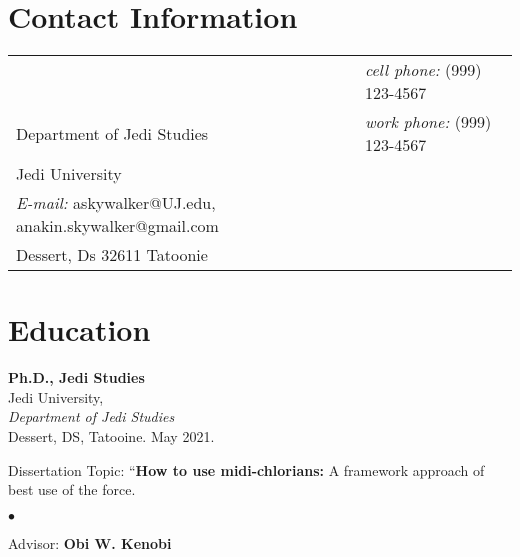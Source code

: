 \documentclass[margin,line]{res}
\newenvironment{list1}{
  \begin{list}{\ding{113}}{%
      \setlength{\itemsep}{0in}
      \setlength{\parsep}{0in} \setlength{\parskip}{0in}
      \setlength{\topsep}{0in} \setlength{\partopsep}{0in} 
      \setlength{\leftmargin}{0.17in}}}{\end{list}}
\newenvironment{list2}{
  \begin{list}{$\bullet$}{%
      \setlength{\itemsep}{0in}
      \setlength{\parsep}{0in} \setlength{\parskip}{0in}
      \setlength{\topsep}{0in} \setlength{\partopsep}{0in} 
      \setlength{\leftmargin}{0.2in}}}{\end{list}}
\begin{document}

\begin{resume}
\section{\sc Contact Information}
\vspace{.05in}
\begin{tabular}{@{}p{2in}p{4in}}
             & {\it cell phone:}  (999) 123-4567 \\            
Department of Jedi Studies   & {\it work phone:}    (999) 123-4567 \\         
Jedi University \\ {\it E-mail:}  askywalker@UJ.edu, anakin.skywalker@gmail.com\\       
Dessert, Ds 32611 Tatoonie  & %
\\     
\end{tabular}



\section{\sc Education}
{\bf Ph.D., Jedi Studies}  \\
Jedi University, \\
{\em Department of Jedi Studies} \\
 Dessert, DS, Tatooine. May 2021.
\begin{list1}
\item[] Dissertation Topic: ``{\bf How to use midi-chlorians:} A framework approach of best use of the force.
\begin{list2}
\vspace*{.05in}
\item[]Advisor: \bf {Obi W. Kenobi}
\end{list2}
\vspace*{.05in}
\end{list1}


\end{resume}
\end{document}
